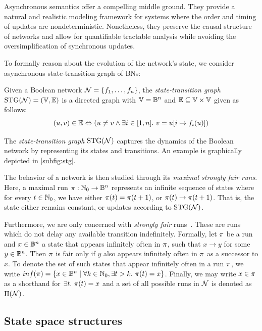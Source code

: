 Asynchronous semantics offer a compelling middle ground. They provide a natural and realistic modeling framework for systems where the order and timing of updates are nondeterministic. Nonetheless, they preserve the causal structure of networks and allow for quantifiable tractable analysis while avoiding the oversimplification of synchronous updates.

To formally reason about the evolution of the network's state, we consider asynchronous state-transition graph of BNs:

\begin{definition}
	Given a Boolean network $\mathbb{\mathcal{N}} = \{ f_1, \ldots, f_n \}$, the \emph{state-transition graph} $\text{\upshape STG}(\mathcal{N}) = (\mathbb{V}, \mathbb{E})$ is a directed graph with $\mathbb{V} = \mathbb{B}^n$ and $\mathbb{E} \subseteq \mathbb{V} \times \mathbb{V}$ given as follows:
	$$
		(u,v) \in \mathbb{E} \Leftrightarrow (u \not= v \land \exists i \in [1,n].~v = u[i \mapsto f_i(u)])
	$$
\end{definition}

The \emph{state-transition graph} $\text{\upshape STG}(\mathcal{N})$ captures the dynamics of the Boolean network by representing its states and transitions. An example is graphically depicted in \autoref{subfig:stg}.

The behavior of a network is then studied through its \emph{maximal strongly fair runs}. Here, a maximal run $\pi: \mathbb{N}_0 \to \mathbb{B}^n$ represents an infinite sequence of states where for every $t \in \mathbb{N}_0$, we have either $\pi(t) = \pi(t+1)$, or $\pi(t) \to \pi(t+1)$. That is, the state either remains constant, or updates according to $\text{\upshape STG}(\mathcal{N})$. 

Furthermore, we are only concerned with \emph{strongly fair} runs~\cite{Abadi1995,Mandon2019CMSB}. These are runs which do not delay any available transition indefinitely. Formally, let $\pi$ be a run and $x \in \mathbb{B}^n$ a state that appears infinitely often in $\pi$, such that $x \to y$ for some $y \in \mathbb{B}^n$. Then $\pi$ is fair only if $y$ also appears infinitely often in $\pi$ as a successor to $x$. To denote the set of such states that appear infinitely often in a run $\pi$, we write $inf(\pi) = \{ x \in \mathbb{B}^n \mid \forall k \in \mathbb{N}_0, \exists t > k.~\pi(t) = x \}$. Finally, we may write $x \in \pi$ as a shorthand for $\exists t.~\pi(t) = x$ and a set of all possible runs in $\mathcal{N}$ is denoted as $\Pi(\mathcal{N})$.

\subsection{State space structures}
\label{ss:state_space_structures}

